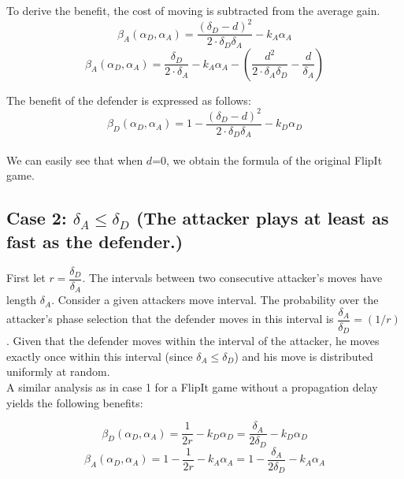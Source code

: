 To derive the benefit, the cost of moving is subtracted from the average gain. 
\begin{equation*}
\beta_{A}(\alpha_{D},\alpha_{A}) = \dfrac { (\delta_{D}-d) ^{2}} {2 \cdot \delta_{D}  \delta_{A}} - k_{A} \alpha_{A}
\end{equation*}
\begin{equation*}
\beta_{A}(\alpha_{D},\alpha_{A}) = \dfrac { \delta_{D}} {2 \cdot \delta_{A}} - k_{A} \alpha_{A} - ( \dfrac{d^{2}}{2 \cdot \delta_{A} \delta_{D}} - \dfrac{d}{\delta_{A}} )
\end{equation*}
 
 
 The benefit of the defender is expressed as follows:
\begin{equation*}
\beta_{D}(\alpha_{D},\alpha_{A}) = 1 - \dfrac { (\delta_{D}-d) ^{2}} {2 \cdot \delta_{D}  \delta_{A}} - k_{D} \alpha_{D}
\end{equation*}
~~\\
We can easily see that when $d$=0, we obtain the formula of the original FlipIt game.\\





\subsection*{\textbf{Case 2:} $\delta_{A} \leq \delta_{D} $ (The attacker plays at least as fast as the defender.) }

First let $r = \dfrac{\delta_{D}}{ \delta_{A} }$. The intervals between two consecutive attacker's moves have length $\delta_{A}$. Consider a given attackers move interval. The probability over the attacker's phase selection that the defender moves in this interval is $\dfrac{\delta_{A}}{ \delta_{D} } = (1/r)$. Given that the defender moves within the interval of the attacker, he moves exactly once within this interval (since $\delta_{A} \leq \delta_{D} $) and his move is distributed uniformly at random. \\

A similar analysis as in case 1 for a FlipIt game without a propagation delay yields the following benefits:

\begin{equation*}
\beta_{D}(\alpha_{D},\alpha_{A}) = \dfrac {1} {2r} - k_{D} \alpha_{D} = \dfrac {\delta_{A}} {2\delta_{D}} - k_{D} \alpha_{D} 
\end{equation*}
\begin{equation*}
\beta_{A}(\alpha_{D},\alpha_{A}) =1 - \dfrac {1} {2r} - k_{A} \alpha_{A} = 1- \dfrac {\delta_{A}} {2\delta_{D}} - k_{A} \alpha_{A}  
\end{equation*}\\

